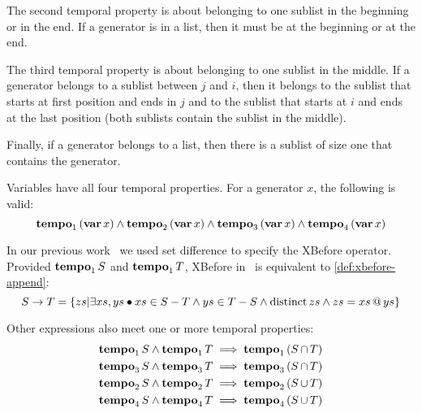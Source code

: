 \documentclass[12pt,openright,twoside,a4paper,oldfontcommands,english,brazil,final]{abntex2}
\makeatletter
\newtheorem{definition}{Definition}[chapter]
\theoremstyle{theo}
\newcommand{\distinctlist}{%
  distinct list\footnote{Although some may use the terminology ``disjoint list'' to call a list of non-repeated elements, we use the same terminology (distinct list) of the theories built-in the \isabellehol tool.}%
  \global\renewcommand{\distinctlist}{distinct list}%
  \global\renewcommand{\distinctlists}{distinct lists}%
}
\newcommand{\distinctlists}{%
  distinct lists\footnote{Although some may use the terminology ``disjoint lists'' to call the lists of non-repeated elements, we use the same terminology (distinct lists) of the theories built-in the \isabellehol tool.}%
  \global\renewcommand{\distinctlist}{distinct list}%
  \global\renewcommand{\distinctlists}{distinct lists}%
}
\newcommand{\isabellehol}[1][]{%
  Isabelle/HOL{#1}\index{Isabelle/HOL}~2015\footnote{The 2002 tutorial is reported in~\cite{NPW2002}, but there is a newer version published with the tool itself.
  The tool and the tutorial are available on their website at \url{http://isabelle.in.tum.de}.}%
  \global\renewcommand{\isabellehol}[1][]{Isabelle/HOL{#1}\index{Isabelle/HOL}\xspace}\xspace %
}
\def\varop{\ensuremath\operatorname{\mathbf{var}}}
\newcommand{\var}[1]{\ensuremath\varop #1}
\def\xbeforeop{\ensuremath\rightarrow}
\newcommand{\xbefore}[2]{\ensuremath #1 \xbeforeop #2 }
\def\Tempotext{Tempo\xspace}
\def\tempoop{\ensuremath\operatorname{\mathbf{tempo}}}
\newcommand{\tempo}[2][1-4]{\ensuremath\tempoop_{#1} #2}
\def\distinctop{\ensuremath\operatorname{distinct}}
\newcommand{\distinct}[1]{\ensuremath\distinctop #1}
\newcommand{\append}[2]{\ensuremath #1 \operatorname{\mathbf{@}} #2}
\newcommand{\parsin}[1]{\ensuremath\left( #1 \right)}
\def\union{\ensuremath\operatorname{\cup}}
\def\inter{\ensuremath\operatorname{\cap}}
\makeatother
\begin{document}
The second temporal property is about belonging to one sublist in the beginning or in the end.
If a generator is in a list, then it must be at the beginning or at the end.
%
%

The third temporal property is about belonging to one sublist in the middle.
If a generator belongs to a sublist between $j$ and $i$, then it belongs to the sublist that starts at first position and ends in $j$ and to the sublist that starts at $i$ and ends at the last position (both sublists contain the sublist in the middle).
%
%

Finally, if a generator belongs to a list, then there is a sublist of size one that contains the generator.
%
%

Variables have all four temporal properties. For a generator $x$, the following is valid:
%
\begin{equation}
\label{law:var-tempo}
\tempo[1]{\left(\var{x}\right)} \land
\tempo[2]{\left(\var{x}\right)} \land
\tempo[3]{\left(\var{x}\right)} \land
\tempo[4]{\left(\var{x}\right)}
\end{equation}

\begin{sloppypar}
In our previous work~\cite{DM2015} we used set difference to specify the \ac{XBefore} operator.
Provided $\tempo[1]{S}$ and $\tempo[1]{T}$, \ac{XBefore} in~\cite{DM2015} is equivalent to \eqref{def:xbefore-append}:
%
\begin{equation}
\label{law:old-xbefore}
\xbefore{S}{T} = \left\{ zs | \exists xs, ys \bullet xs \in S-T \land ys \in T-S \land \distinct{zs} \land zs = \append{xs}{ys}  \right\}
\end{equation}
\end{sloppypar}

Other expressions also meet one or more temporal properties:
\begin{subequations}
\begin{align}
\tempo[1]{S} \land \tempo[1]{T} & \implies \tempo[1]{\parsin{S \inter T}}\label{law:tempo1-inter}\\
\tempo[3]{S} \land \tempo[3]{T} & \implies \tempo[3]{\parsin{S \inter T}}\label{law:tempo3-inter}\\
\tempo[2]{S} \land \tempo[2]{T} & \implies \tempo[2]{\parsin{S \union T}}\label{law:tempo2-union}\\
\tempo[4]{S} \land \tempo[4]{T} & \implies \tempo[4]{\parsin{S \union T}}\label{law:tempo4-union}
\end{align}
\end{subequations}
\end{document}
